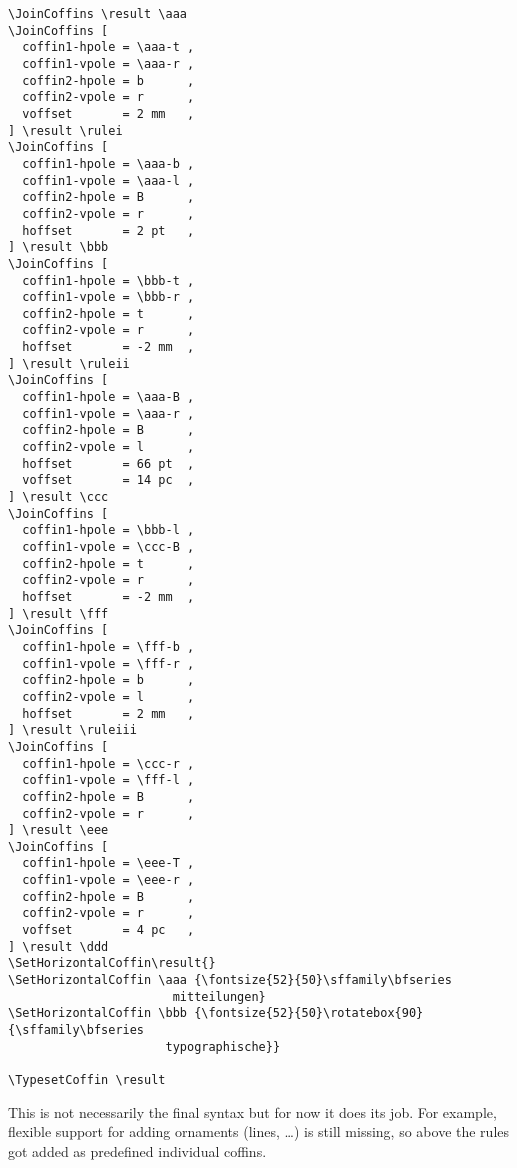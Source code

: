 \documentclass{article}
\begin{document}
\begin{center}
\begin{minipage}{14cm}
\begin{verbatim}
\JoinCoffins \result \aaa
\JoinCoffins [
  coffin1-hpole = \aaa-t ,
  coffin1-vpole = \aaa-r ,
  coffin2-hpole = b      ,
  coffin2-vpole = r      ,
  voffset       = 2 mm   ,
] \result \rulei
\JoinCoffins [
  coffin1-hpole = \aaa-b ,
  coffin1-vpole = \aaa-l ,
  coffin2-hpole = B      ,
  coffin2-vpole = r      ,
  hoffset       = 2 pt   ,
] \result \bbb
\JoinCoffins [
  coffin1-hpole = \bbb-t ,
  coffin1-vpole = \bbb-r ,
  coffin2-hpole = t      ,
  coffin2-vpole = r      ,
  hoffset       = -2 mm  ,
] \result \ruleii
\JoinCoffins [
  coffin1-hpole = \aaa-B ,
  coffin1-vpole = \aaa-r ,
  coffin2-hpole = B      ,
  coffin2-vpole = l      ,
  hoffset       = 66 pt  ,
  voffset       = 14 pc  ,
] \result \ccc
\JoinCoffins [
  coffin1-hpole = \bbb-l ,
  coffin1-vpole = \ccc-B ,
  coffin2-hpole = t      ,
  coffin2-vpole = r      ,
  hoffset       = -2 mm  ,
] \result \fff
\JoinCoffins [
  coffin1-hpole = \fff-b ,
  coffin1-vpole = \fff-r ,
  coffin2-hpole = b      ,
  coffin2-vpole = l      ,
  hoffset       = 2 mm   ,
] \result \ruleiii
\JoinCoffins [
  coffin1-hpole = \ccc-r ,
  coffin1-vpole = \fff-l ,
  coffin2-hpole = B      ,
  coffin2-vpole = r      ,
] \result \eee
\JoinCoffins [
  coffin1-hpole = \eee-T ,
  coffin1-vpole = \eee-r ,
  coffin2-hpole = B      ,
  coffin2-vpole = r      ,
  voffset       = 4 pc   ,
] \result \ddd
\SetHorizontalCoffin\result{}
\SetHorizontalCoffin \aaa {\fontsize{52}{50}\sffamily\bfseries
                       mitteilungen}
\SetHorizontalCoffin \bbb {\fontsize{52}{50}\rotatebox{90}{\sffamily\bfseries
                      typographische}}

\TypesetCoffin \result
\end{verbatim}

This is not necessarily the final syntax but for now it does its job. For
example, flexible support for adding ornaments (lines, \ldots) is still
missing, so above the rules got added as predefined individual coffins.

\end{minipage}
\end{center}
\end{document}
